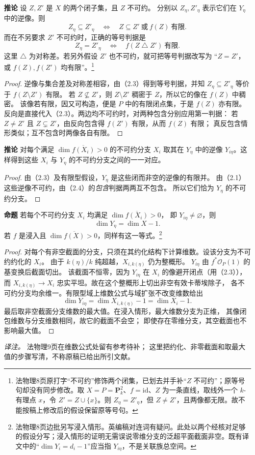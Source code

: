 \documentclass[openany,fontset=fandol]{ctexbook}
\newcommand{\PP}{\mathbf P}
\newcommand{\OO}{\mathcal O}
\newcommand{\tagitem}[2]{\par\medskip\noindent\textbf{#1\quad #2}\enspace}
\begin{document}
\tagitem{推论}{2.4}
设 \(Z,Z'\) 是 \(X\) 的两个闭子集，且 \(Z\) 不可约。
分别以 \(Z_\eta,Z'_\eta\) 表示它们在 \(Y_\eta\) 中的逆像。则
\[
 Z_\eta\subseteq Z'_\eta
 \quad\Longleftrightarrow\quad
 Z\subseteq Z'\ \text{或}\ f(Z)\ \text{有限}.
\]
而在不另要求 \(Z'\) 不可约时，正确的等号判据是
\[
 Z_\eta=Z'_\eta\quad\Longleftrightarrow\quad
 f(Z\mathbin{\triangle} Z')\ \text{有限}.
\]
这里 \(\triangle\) 为对称差。若另外假设 \(Z'\) 也不可约，就可把等号判据改写为
“\(Z=Z'\)，或 \(f(Z),f(Z')\) 均有限”。\footnote{法物理8页原打字“不可约”修饰两个闭集，已划去并手补“\(Z\) 不可约”；原等号句却没有同步修改。取 \(X=P=\PP^2_k\)、\(f=\mathrm{id}\)、\(Z\) 为一条直线，取线外一个 \(k\)-有理点 \(x\)，令 \(Z'=Z\cup\{x\}\)。则 \(Z_\eta=Z'_\eta\)，但 \(Z\ne Z'\)，且两像都无限。故不能按稿上修改后的假设保留原等号句。}
\begin{proof}
逆像与集合差及对称差相容，由（2.3）得到等号判据，并知
\(Z_\eta\subseteq Z'_\eta\) 等价于 \(f(Z\setminus Z')\) 有限。
若 \(Z\nsubseteq Z'\)，则 \(Z\setminus Z'\) 稠密于 \(Z\)，所以它的像在 \(f(Z)\) 中稠密。
该像若有限，因又可构造，便是 \(P\) 中的有限闭点集，于是 \(f(Z)\) 亦有限。
反向是直接代入（2.3）。两边均不可约时，对两种包含分别应用第一判据：
若 \(Z\ne Z'\) 且 \(Z\subsetneq Z'\)，由反向包含得 \(f(Z')\) 有限，从而 \(f(Z)\) 有限；
真反包含情形类似；互不包含时两像各自有限。
\end{proof}

\tagitem{推论}{2.5}
对每个满足 \(\dim\overline{f(X_i)}>0\) 的不可约分支 \(X_i\) 取其在 \(Y_\eta\) 中的逆像
\(Y_{i\eta}\)。这样得到这些 \(X_i\) 与 \(Y_\eta\) 的不可约分支之间的一一对应。
\begin{proof}
由（2.3）及有限型假设，\(Y_\eta\) 是这些闭而非空的逆像的有限并。
由（2.1）这些逆像不可约，由（2.4）的\emph{包含}判据两两互不包含。
所以它们恰为 \(Y_\eta\) 的不可约分支。
\end{proof}

\tagitem{命题}{2.6}
若每个不可约分支 \(X_i\) 均满足 \(\dim\overline{f(X_i)}>0\)，
即 \(Y_{i\eta}\ne\varnothing\)，则
\[
 \dim Y_\eta=\dim X-1.
\]
若 \(f\) 是浸入且 \(\dim\overline{f(X)}>0\)，同样有这一等式。\footnote{法物理8页边批另写浸入情形。英编稿对连词有疑问。此处以两个经核对足够的假设分写；浸入情形的证明无需误说零维分支的泛超平面截面非空。既有译文中的“\(\dim Y_i=d_i-1\)”应当指 \(Y_{i\eta}\)，不是关联族总空间。}
\begin{proof}
对每个有非空截面的分支，只须在其约化结构下计算维数。设该分支为不可约约化的 \(X_i\)。
由于 \(k(\eta)/k\) 纯超越，\(X_{i,k(\eta)}\) 仍为整概形。
\(Y_{i\eta}\) 由 \(f^*\OO_P(1)\) 的基变换后截面切出。
该截面不恒零，因为 \(Y_{i\eta}\) 在 \(X_i\) 的像避开闭点（用（2.3）），
而 \(X_{i,k(\eta)}\to X_i\) 忠实平坦。故在这个整概形上切出非空有效卡蒂埃除子，
各不可约分支均余维一。有限型域上维数公式与域扩张不改变维数给出
\[
 \dim Y_{i\eta}=\dim X_{i,k(\eta)}-1=\dim X_i-1.
\]
最后取非空截面分支维数的最大值。在浸入情形，最大维数分支为正维，
其像闭包维数与分支维数相同，故它的截面不会空；
即使存在零维分支，其空截面也不影响最大值。
\end{proof}
\noindent\emph{译注。} 法物理9页在维数公式处留有参考待补；
这里把约化、非零截面和取最大值的步骤写清，不称原稿已给出所引文献。
\end{document}
